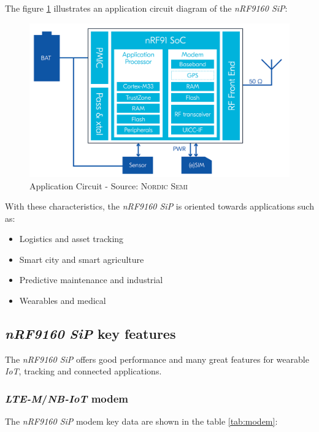 \documentclass[report.tex]{subfiles}
\begin{document}
The figure \ref{fig:nRF9160_SiP_product_brief} illustrates an application circuit diagram of the \textit{nRF9160 SiP}\cite{nrf9160brief}:

\begin{figure}[H]
	\centering
	\includegraphics[width=1\textwidth]{Include/Figure/Hardware/nRF9160_SiP_product_brief.png}
	\caption{Application Circuit - Source: \textsc{Nordic Semi}\cite{nrf9160brief}}
	\label{fig:nRF9160_SiP_product_brief}
\end{figure}

With these characteristics, the \textit{nRF9160 SiP} is oriented towards applications such as:
\begin{itemize}
\item Logistics and asset tracking
\item Smart city and smart agriculture
\item Predictive maintenance and industrial
\item Wearables and medical
\end{itemize}

\subsection{\textit{nRF9160 SiP} key features}
The \textit{nRF9160 SiP} offers good performance and many great features for wearable \textit{IoT}, tracking and connected applications.

\subsubsection{\textit{LTE-M}/\textit{NB-IoT} modem}
The \textit{nRF9160 SiP} modem key data are shown in the table \ref{tab:modem}:
\end{document}

